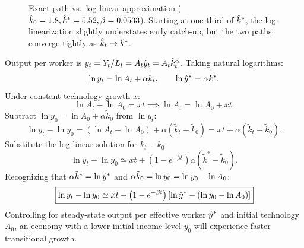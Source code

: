 \documentclass[11pt]{article}
\begin{document}
\begin{figure}[ht]
\centering
{}
\caption{Exact path vs.\ log-linear approximation ($\hat{k}_0 = 1.8, \hat{k}^* = 5.52, \beta = 0.0533$). Starting at one-third of $\hat{k}^*$, the log-linearization slightly understates early catch-up, but the two paths converge tightly as $\hat{k}_t \to \hat{k}^*$.}
\end{figure}

Output per worker is $y_t = Y_t / L_t = A_t \hat{y}_t = A_t \hat{k}_t^\alpha$. Taking natural logarithms:
\[
\ln y_t = \ln A_t + \alpha \tilde{k}_t, \qquad \ln\hat{y}^* = \alpha \tilde{k}^*.
\]
Under constant technology growth $x$:
\[
\ln A_t - \ln A_0 = xt \implies \ln A_t = \ln A_0 + xt.
\]
Subtract $\ln y_0 = \ln A_0 + \alpha\tilde{k}_0$ from $\ln y_t$:
\[
\ln y_t - \ln y_0 = (\ln A_t - \ln A_0) + \alpha(\tilde{k}_t - \tilde{k}_0) = xt + \alpha(\tilde{k}_t - \tilde{k}_0).
\]
Substitute the log-linear solution for $\tilde{k}_t - \tilde{k}_0$:
\[
\ln y_t - \ln y_0 \simeq xt + \left(1 - e^{-\beta t}\right)\alpha(\tilde{k}^* - \tilde{k}_0).
\]
Recognizing that $\alpha\tilde{k}^* = \ln\hat{y}^*$ and $\alpha\tilde{k}_0 = \ln\hat{y}_0 = \ln y_0 - \ln A_0$:
\[
\boxed{\ln y_t - \ln y_0 \simeq xt + \left(1 - e^{-\beta t}\right)\left[\ln\hat{y}^* - (\ln y_0 - \ln A_0)\right]}
\]
 Controlling for steady-state output per effective worker $\hat{y}^*$ and initial technology $A_0$, an economy with a lower initial income level $y_0$ will experience faster transitional growth.
\end{document}

